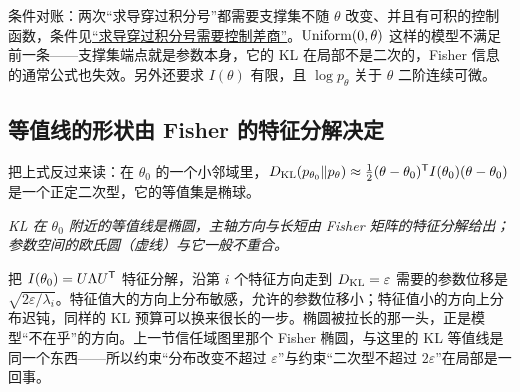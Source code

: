 条件对账：两次``求导穿过积分号''都需要支撑集不随 \(\theta\) 改变、并且有可积的控制函数，条件见\hyperref[sec:12-Real-Analysis-Support/04-Limits-and-Integration/03]{``求导穿过积分号需要控制差商''}。\(\operatorname{Uniform}(0,\theta)\) 这样的模型不满足前一条——支撑集端点就是参数本身，它的 KL 在局部不是二次的，Fisher 信息的通常公式也失效。另外还要求 \(I(\theta)\) 有限，且 \(\log p_\theta\) 关于 \(\theta\) 二阶连续可微。

\subsection{等值线的形状由 Fisher 的特征分解决定}

把上式反过来读：在 \(\theta_0\) 的一个小邻域里，\(D_{\mathrm{KL}}(p_{\theta_0}\|p_\theta)\approx\tfrac12(\theta-\theta_0)^{\mathsf{T}}I(\theta_0)(\theta-\theta_0)\) 是一个正定二次型，它的等值集是椭球。

\begin{center}
\end{center}

\emph{KL 在 \(\theta_0\) 附近的等值线是椭圆，主轴方向与长短由 Fisher 矩阵的特征分解给出；参数空间的欧氏圆（虚线）与它一般不重合。}

把 \(I(\theta_0)=U\Lambda U^{\mathsf{T}}\) 特征分解，沿第 \(i\) 个特征方向走到 \(D_{\mathrm{KL}}=\varepsilon\) 需要的参数位移是 \(\sqrt{2\varepsilon/\lambda_i}\)。特征值大的方向上分布敏感，允许的参数位移小；特征值小的方向上分布迟钝，同样的 KL 预算可以换来很长的一步。椭圆被拉长的那一头，正是模型``不在乎''的方向。上一节信任域图里那个 Fisher 椭圆，与这里的 KL 等值线是同一个东西——所以约束``分布改变不超过 \(\varepsilon\)''与约束``二次型不超过 \(2\varepsilon\)''在局部是一回事。


